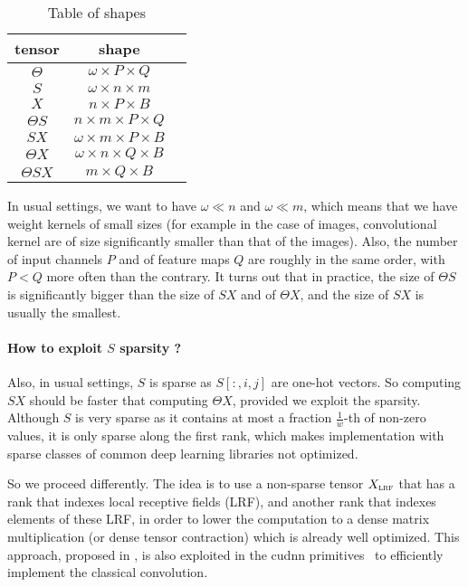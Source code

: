 \begin{table}[H]
  \centering
\begin{tabular}{ccc}
  tensor & shape\\
  \hline
  $\Theta$ & $\omega \times P \times Q$\\
  $S$ & $\omega \times n \times m$\\
  $X$ & $n \times P \times B$\\
  $\Theta S$ & $n \times m \times P \times Q$\\
  $SX$ & $\omega \times m \times P \times B$\\
  $\Theta X$ & $\omega \times n \times Q \times B$\\
  $\Theta SX$ & $m \times Q \times B$
\end{tabular}
\caption{Table of shapes}
\label{tab:mid}
\end{table}

In usual settings, we want to have $\omega \ll n$ and $\omega \ll m$, which means that we have weight kernels of small sizes (for example in the case of images, convolutional kernel are of size significantly smaller than that of the images). Also, the number of input channels $P$ and of feature maps $Q$ are roughly in the same order, with $P < Q$ more often than the contrary. It turns out that in practice, the size of $\Theta S$ is significantly bigger than the size of $SX$ and of $\Theta X$, and the size of $SX$ is usually the smallest.

\paragraph{How to exploit $S$ sparsity ?}
Also, in usual settings, $S$ is sparse as $S[:,i,j]$ are one-hot vectors. So computing $SX$ should be faster that computing $\Theta X$, provided we exploit the sparsity. Although $S$ is very sparse as it contains at most a fraction $\frac{1}{w}$-th of non-zero values, it is only sparse along the first rank, which makes implementation with sparse classes of common deep learning libraries not optimized. 

So we proceed differently. The idea is to use a non-sparse tensor $X_{\operatorname{\textsc{lrf}}}$ that has a rank that indexes local receptive fields (LRF), and another rank that indexes elements of these LRF, in order to lower the computation to a dense matrix multiplication (or dense tensor contraction) which is already well optimized. This approach, proposed in \cite{chellapilla2006high}, is also exploited in the cudnn primitives~\citep{chetlur2014cudnn} to efficiently implement the classical convolution.

